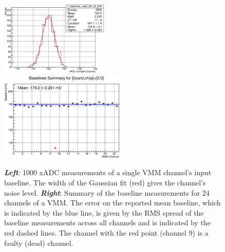 \begin{figure}[!htb]
    \begin{center}
        \includegraphics[width=0.46\textwidth]{figures/nsw/calibration/xadc_calib_channel_baseline_samples}
        \includegraphics[width=0.53\textwidth]{figures/nsw/calibration/calib_baselines_vmm_summary}
        \caption{
            \textbf{\textit{Left}}: 1000 xADC measurements of a single VMM channel's input baseline.
                The width of the Gaussian fit (red) gives the channel's noise level.
            \textbf{\textit{Right}}: Summary of the baseline measurements for 24 channels of a VMM.
                The error on the reported mean baseline, which is indicated by the blue line, is given by the RMS spread of the baseline measurements
                across all channels and is indicated by the red dashed lines.
                The channel with the red point (channel 9) is a faulty (dead) channel.
        }
        \label{fig:baselines_calib}
    \end{center}
\end{figure}

